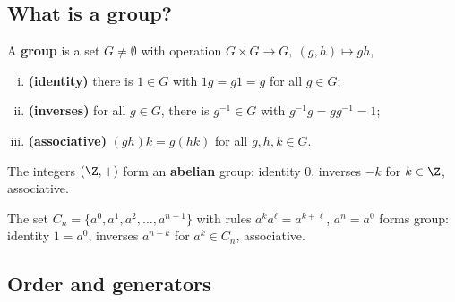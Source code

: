 \subsection{What is a group?}

\begin{slide}
    \begin{definition}[group]
        \vspace{0pt}
        A \textbf{group} is a set $G \neq \emptyset$ with operation $G \times G \to G,\ (g,h) \mapsto gh$, \pause

        \begin{enumerate}[(i)]
            \item \textbf{(identity)} there is $1 \in G$ with $1g = g1 = g$ for all $g \in G$; \pause
            \item \textbf{(inverses)} for all $g \in G$, there is $g^{-1} \in G$ with $g^{-1}g = gg^{-1} = 1$; \pause
            \item \textbf{(associative)} $(gh)k = g(hk)$ for all $g,h,k \in G$.
        \end{enumerate}
    \end{definition} \pause

    \begin{example}
        \vspace{0pt}
        The integers $(\Z,+)$ form an \textbf{abelian} group: identity \pause $0$, inverses \pause $-k$ for $k \in \Z$, associative.
    \end{example} \pause

    \begin{example}
        \vspace{0pt}
        The set $C_n = \{a^0,a^1,a^2,\dotsc,a^{n-1}\}$ with rules $a^ka^\ell = a^{k+\ell}$, $a^n = a^0$ forms group: identity \pause $1 = a^0$, inverses \pause $a^{n-k}$ for $a^k \in C_n$, associative.
    \end{example}
\end{slide}

\subsection{Order and generators}

